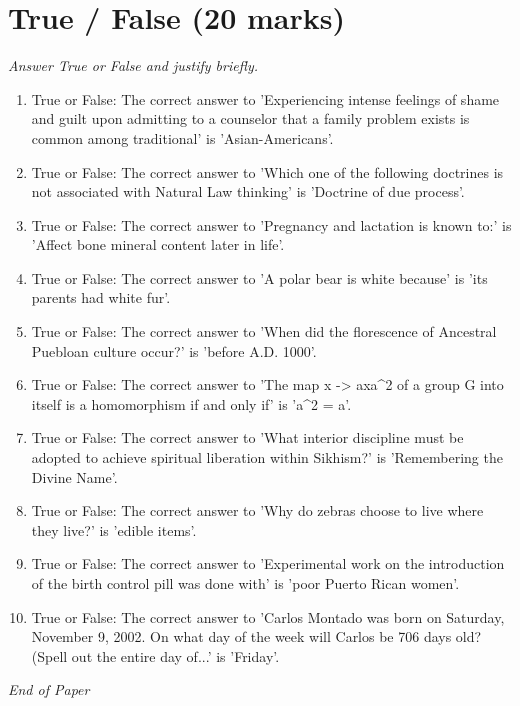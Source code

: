 \documentclass[12pt]{article}
\begin{document}
\section*{True / False (20 marks)}
\textit{Answer True or False and justify briefly.}
\begin{enumerate}[label=\arabic*.]
\item True or False: The correct answer to 'Experiencing intense feelings of shame and guilt upon admitting to a counselor that a family problem exists is common among traditional' is 'Asian-Americans'.
\item True or False: The correct answer to 'Which one of the following doctrines is not associated with Natural Law thinking' is 'Doctrine of due process'.
\item True or False: The correct answer to 'Pregnancy and lactation is known to:' is 'Affect bone mineral content later in life'.
\item True or False: The correct answer to 'A polar bear is white because' is 'its parents had white fur'.
\item True or False: The correct answer to 'When did the florescence of Ancestral Puebloan culture occur?' is 'before A.D. 1000'.
\item True or False: The correct answer to 'The map x -> axa\^{}2 of a group G into itself is a homomorphism if and only if' is 'a\^{}2 = a'.
\item True or False: The correct answer to 'What interior discipline must be adopted to achieve spiritual liberation within Sikhism?' is 'Remembering the Divine Name'.
\item True or False: The correct answer to 'Why do zebras choose to live where they live?' is 'edible items'.
\item True or False: The correct answer to 'Experimental work on the introduction of the birth control pill was done with' is 'poor Puerto Rican women'.
\item True or False: The correct answer to 'Carlos Montado was born on Saturday, November 9, 2002. On what day of the week will Carlos be 706 days old? (Spell out the entire day of...' is 'Friday'.
\end{enumerate}

\vfill
\noindent\textit{End of Paper}
\end{document}
